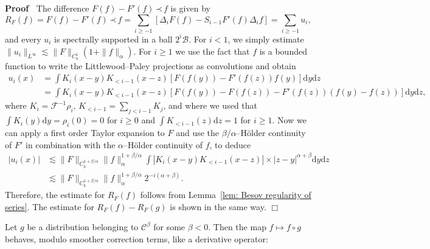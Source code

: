 \documentclass[a4paper,11pt]{article}
\newcommand{\mathd}{\mathrm{d}}
\newenvironment{proof}{\noindent\textbf{Proof\ }}{\hspace*{\fill}$\Box$\medskip}
\newcommand{\CB}{\mathscr{B}}
\newcommand{\CF}{\mathscr{F}}
\newcommand{\CC}{\mathscr{C}}
\newcommand{\lpara}{\,\mathord{\prec}\,}
\newcommand{\reso}{\,\mathord{\circ}\,}
\begin{document}
\begin{proof}
  The difference $F (f) - F' (f) \lpara f$ is given by
  \[ R_F (f) = F (f) - F' (f) \lpara f = \sum_{i \geqslant - 1} [\Delta_i F (f)
     - S_{i - 1} F' (f) \Delta_i f] = \sum_{i \geqslant - 1} u_i, \]
  and every $u_i$ is spectrally supported in a ball $2^i \CB$. For $i < 1$, we
  simply estimate $\|u_i \|_{L^{\infty}} \lesssim \|F\|_{C^1_b}  (1
  +\|f\|_{\alpha})$. For $i \geqslant 1$ we use the fact that $f$ is a bounded
  function to write the Littlewood--Paley projections as convolutions and
  obtain
  \begin{align*}
    u_i (x) & = \int K_i  (x - y) K_{< i - 1}  (x - z)  [F (f (y)) - F' (f
    (z)) f (y)] \mathd y \mathd z\\
    & = \int K_i  (x - y) K_{< i - 1}  (x - z)  [F (f (y)) - F (f (z)) - F'
    (f (z)) (f (y) - f (z))] \mathd y \mathd z,
  \end{align*}
  where $K_i = \CF^{- 1} \rho_i$, $K_{< i - 1} = \sum_{j < i - 1} K_j$, and
  where we used that $\int K_i (y) \mathd y = \rho_i (0) = 0$ for $i \geqslant
  0$ and $\int K_{< i - 1} (z) \mathd z = 1$ for $i \geqslant 1$. Now we can
  apply a first order Taylor expansion to $F$ and use the $\beta /
  \alpha$--H{\"o}lder continuity of $F'$ in combination with the
  $\alpha$--H{\"o}lder continuity of $f$, to deduce
  \begin{align*}
    |u_i (x) | & \lesssim \|F\|_{C^{1 + \beta / \alpha}_b} \|f\|_{\alpha}^{1 +
    \beta / \alpha}  \int |K_i (x - y) K_{< i - 1} (x - z) | \times |z -
    y|^{\alpha + \beta} \mathd y \mathd z\\
    & \lesssim \|F\|_{C^{1 + \beta / \alpha}_b} \|f\|_{\alpha}^{1 + \beta /
    \alpha} 2^{- i (\alpha + \beta)} .
  \end{align*}
  Therefore, the estimate for $R_F (f)$ follows from Lemma~\ref{lem: Besov
  regularity of series}. The estimate for $R_F (f) - R_F (g)$ is shown in the
  same way.
\end{proof}

Let $g$ be a distribution belonging to $\CC^{\beta}$ for some $\beta < 0$.
Then the map $f \mapsto f \reso g$ behaves, modulo smoother correction terms,
like a derivative operator:
\end{document}
